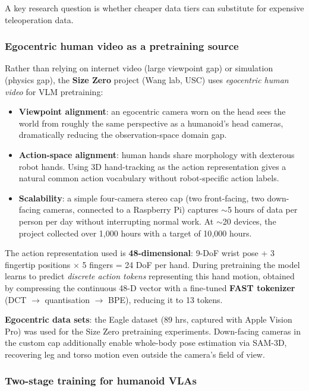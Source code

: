 A key research question is whether cheaper data tiers can substitute for expensive teleoperation data.

\subsubsection{Egocentric human video as a pretraining source}

Rather than relying on internet video (large viewpoint gap) or simulation (physics gap), the \textbf{Size Zero} project (Wang lab, USC) uses \emph{egocentric human video} for VLM pretraining:

\begin{itemize}
  \item \textbf{Viewpoint alignment}: an egocentric camera worn on the head sees the world from roughly the same perspective as a humanoid's head cameras, dramatically reducing the observation-space domain gap.
  \item \textbf{Action-space alignment}: human hands share morphology with dexterous robot hands. Using 3D hand-tracking as the action representation gives a natural common action vocabulary without robot-specific action labels.
  \item \textbf{Scalability}: a simple four-camera stereo cap (two front-facing, two down-facing cameras, connected to a Raspberry Pi) captures $\sim$5 hours of data per person per day without interrupting normal work. At $\sim$20 devices, the project collected over 1{,}000 hours with a target of 10{,}000 hours.
\end{itemize}

The action representation used is \textbf{48-dimensional}: 9-DoF wrist pose + 3 fingertip positions $\times$ 5 fingers = 24 DoF per hand. During pretraining the model learns to predict \emph{discrete action tokens} representing this hand motion, obtained by compressing the continuous 48-D vector with a fine-tuned \textbf{FAST tokenizer} (DCT $\to$ quantisation $\to$ BPE), reducing it to 13 tokens.

\begin{notebox}
\textbf{Egocentric data sets}: the Eagle dataset (89 hrs, captured with Apple Vision Pro) was used for the Size Zero pretraining experiments. Down-facing cameras in the custom cap additionally enable whole-body pose estimation via SAM-3D, recovering leg and torso motion even outside the camera's field of view.
\end{notebox}

\subsubsection{Two-stage training for humanoid VLAs}

